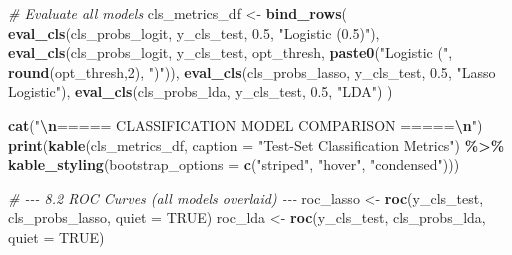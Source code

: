 \documentclass[
]{article}
\newenvironment{Shaded}{\begin{snugshade}}{\end{snugshade}}
\newcommand{\AttributeTok}[1]{\textcolor[rgb]{0.13,0.29,0.53}{#1}}
\newcommand{\CommentTok}[1]{\textcolor[rgb]{0.56,0.35,0.01}{\textit{#1}}}
\newcommand{\ConstantTok}[1]{\textcolor[rgb]{0.56,0.35,0.01}{#1}}
\newcommand{\DecValTok}[1]{\textcolor[rgb]{0.00,0.00,0.81}{#1}}
\newcommand{\FloatTok}[1]{\textcolor[rgb]{0.00,0.00,0.81}{#1}}
\newcommand{\FunctionTok}[1]{\textcolor[rgb]{0.13,0.29,0.53}{\textbf{#1}}}
\newcommand{\NormalTok}[1]{#1}
\newcommand{\OtherTok}[1]{\textcolor[rgb]{0.56,0.35,0.01}{#1}}
\newcommand{\SpecialCharTok}[1]{\textcolor[rgb]{0.81,0.36,0.00}{\textbf{#1}}}
\newcommand{\StringTok}[1]{\textcolor[rgb]{0.31,0.60,0.02}{#1}}
\begin{document}
\begin{Shaded}
\begin{Highlighting}[]
  \CommentTok{\# Evaluate all models}
\NormalTok{  cls\_metrics\_df }\OtherTok{\textless{}{-}} \FunctionTok{bind\_rows}\NormalTok{(}
    \FunctionTok{eval\_cls}\NormalTok{(cls\_probs\_logit, y\_cls\_test, }\FloatTok{0.5}\NormalTok{,       }\StringTok{"Logistic (0.5)"}\NormalTok{),}
    \FunctionTok{eval\_cls}\NormalTok{(cls\_probs\_logit, y\_cls\_test, opt\_thresh, }\FunctionTok{paste0}\NormalTok{(}\StringTok{"Logistic ("}\NormalTok{, }\FunctionTok{round}\NormalTok{(opt\_thresh,}\DecValTok{2}\NormalTok{), }\StringTok{")"}\NormalTok{)),}
    \FunctionTok{eval\_cls}\NormalTok{(cls\_probs\_lasso, y\_cls\_test, }\FloatTok{0.5}\NormalTok{,       }\StringTok{"Lasso Logistic"}\NormalTok{),}
    \FunctionTok{eval\_cls}\NormalTok{(cls\_probs\_lda,   y\_cls\_test, }\FloatTok{0.5}\NormalTok{,       }\StringTok{"LDA"}\NormalTok{)}
\NormalTok{  )}

  \FunctionTok{cat}\NormalTok{(}\StringTok{"}\SpecialCharTok{\textbackslash{}n}\StringTok{===== CLASSIFICATION MODEL COMPARISON =====}\SpecialCharTok{\textbackslash{}n}\StringTok{"}\NormalTok{)}
  \FunctionTok{print}\NormalTok{(}\FunctionTok{kable}\NormalTok{(cls\_metrics\_df, }\AttributeTok{caption =} \StringTok{"Test{-}Set Classification Metrics"}\NormalTok{) }\SpecialCharTok{\%\textgreater{}\%}
          \FunctionTok{kable\_styling}\NormalTok{(}\AttributeTok{bootstrap\_options =} \FunctionTok{c}\NormalTok{(}\StringTok{"striped"}\NormalTok{, }\StringTok{"hover"}\NormalTok{, }\StringTok{"condensed"}\NormalTok{)))}

  \CommentTok{\# {-}{-}{-} 8.2  ROC Curves (all models overlaid) {-}{-}{-}}
\NormalTok{  roc\_lasso }\OtherTok{\textless{}{-}} \FunctionTok{roc}\NormalTok{(y\_cls\_test, cls\_probs\_lasso, }\AttributeTok{quiet =} \ConstantTok{TRUE}\NormalTok{)}
\NormalTok{  roc\_lda   }\OtherTok{\textless{}{-}} \FunctionTok{roc}\NormalTok{(y\_cls\_test, cls\_probs\_lda,   }\AttributeTok{quiet =} \ConstantTok{TRUE}\NormalTok{)}


\end{Highlighting}
\end{Shaded}
\end{document}
